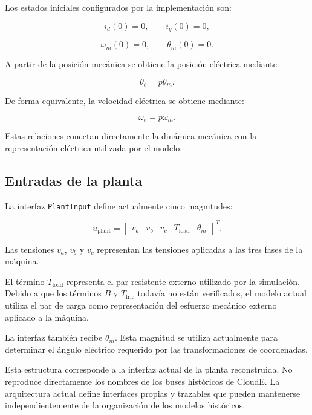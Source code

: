 Los estados iniciales configurados por la implementación son:

\begin{equation}
i_d(0)=0,
\qquad
i_q(0)=0,
\end{equation}

\begin{equation}
\omega_m(0)=0,
\qquad
\theta_m(0)=0.
\end{equation}

A partir de la posición mecánica se obtiene la posición eléctrica mediante:

\begin{equation}
\theta_e=p\theta_m.
\end{equation}

De forma equivalente, la velocidad eléctrica se obtiene mediante:

\begin{equation}
\omega_e=p\omega_m.
\end{equation}

Estas relaciones conectan directamente la dinámica mecánica con la representación eléctrica utilizada por el modelo.

\subsection{Entradas de la planta}

La interfaz \texttt{PlantInput} define actualmente cinco magnitudes:

\begin{equation}
u_{\mathrm{plant}}=
\begin{bmatrix}
v_a &
v_b &
v_c &
T_{\mathrm{load}} &
\theta_m
\end{bmatrix}^{T}.
\end{equation}

Las tensiones $v_a$, $v_b$ y $v_c$ representan las tensiones aplicadas a las tres fases de la máquina.

El término $T_{\mathrm{load}}$ representa el par resistente externo utilizado por la simulación. Debido a que los términos $B$ y $T_{\mathrm{fric}}$ todavía no están verificados, el modelo actual utiliza el par de carga como representación del esfuerzo mecánico externo aplicado a la máquina.

La interfaz también recibe $\theta_m$. Esta magnitud se utiliza actualmente para determinar el ángulo eléctrico requerido por las transformaciones de coordenadas.

Esta estructura corresponde a la interfaz actual de la planta reconstruida. No reproduce directamente los nombres de los buses históricos de CloudE. La arquitectura actual define interfaces propias y trazables que pueden mantenerse independientemente de la organización de los modelos históricos.

